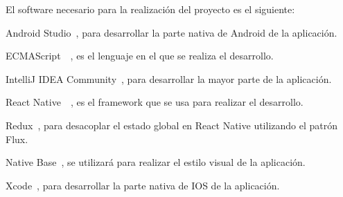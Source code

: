  El software necesario para la realización del proyecto es el siguiente:
\begin{description}
	\item Android Studio~\cite{ASTUDIO}, para desarrollar la parte nativa de Android de la aplicación.
	\item ECMAScript~\cite{ECMA}~\cite{ECMABOOK}, es el lenguaje en el que se realiza el desarrollo.
	\item IntelliJ IDEA Community~\cite{IDEA}, para desarrollar la mayor parte de la aplicación.
	\item React Native~\cite{RENA}~\cite{REACTBOOK}, es el framework que se usa para realizar el desarrollo.
	\item Redux~\cite{REDUX}, para desacoplar el estado global en React Native utilizando el patrón Flux.
	\item Native Base~\cite{NABA}, se utilizará para realizar el estilo visual de la aplicación.
	\item Xcode~\cite{XCODE}, para desarrollar la parte nativa de IOS de la aplicación.
\end{description}

